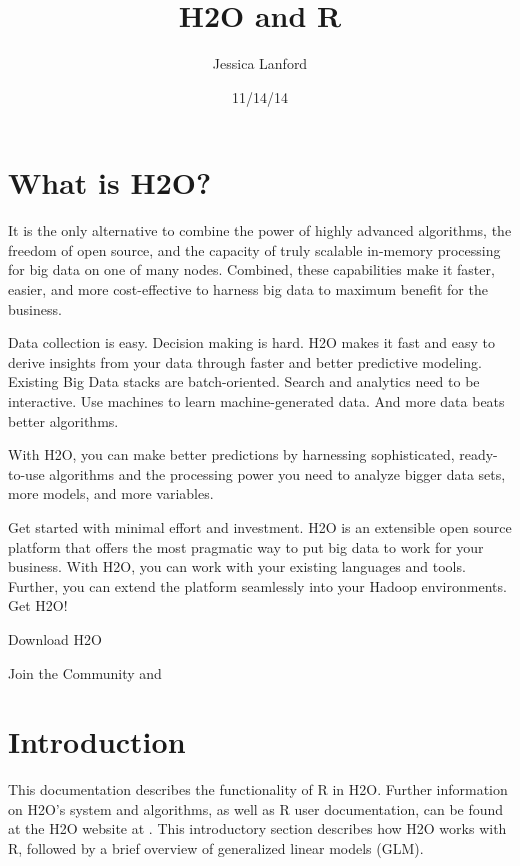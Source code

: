 \documentclass[11pt]{article}
\begin{document}
\title{H2O and R}
\author{Jessica Lanford}
\date{11/14/14}
\maketitle



\section{What is H2O?}\label{1} 

It is the only alternative to combine the power of highly advanced algorithms, the freedom of open source, and the capacity of truly scalable in-memory processing for big data on one of many nodes. Combined, these capabilities make it faster, easier, and more cost-effective to harness big data to maximum benefit for the business. 

Data collection is easy. Decision making is hard. H2O makes it fast and easy to derive insights from your data through faster and better predictive modeling. Existing Big Data stacks are batch-oriented. Search and analytics need to be interactive. Use machines to learn machine-generated data. And more data beats better algorithms. 

With H2O, you can make better predictions by harnessing sophisticated, ready-to-use algorithms and the processing power you need to analyze bigger data sets, more models, and more variables. 

Get started with minimal effort and investment. H2O is an extensible open source platform that offers the most pragmatic way to put big data to work for your business. With H2O, you can work with your existing languages and tools. Further, you can extend the platform seamlessly into your Hadoop environments. Get H2O!

Download H2O

Join the Community
 and 

\section{Introduction}\label{2}

This documentation describes the functionality of R in H2O. Further information on H2O's system and algorithms, as well as R user documentation, can be found at the H2O website at . This introductory section describes how H2O works with R, followed by a brief overview of generalized linear models (GLM). 
\end{document}
